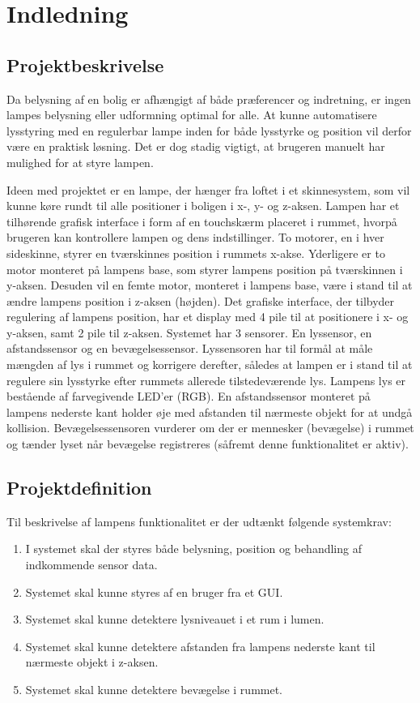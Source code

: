 \section{Indledning}

\subsection{Projektbeskrivelse}
Da belysning af en bolig er afhængigt af både præferencer og indretning, er ingen lampes belysning eller udformning optimal for alle. At kunne automatisere lysstyring med en regulerbar lampe inden for både lysstyrke og position vil derfor være en praktisk løsning. Det er dog stadig vigtigt, at brugeren manuelt har mulighed for at styre lampen.

Ideen med projektet er en lampe, der hænger fra loftet i et skinnesystem, som vil kunne køre rundt til alle positioner i boligen i x-, y- og z-aksen. Lampen har et tilhørende grafisk interface i form af en touchskærm placeret i rummet, hvorpå brugeren kan kontrollere lampen og dens indstillinger. To motorer, en i hver sideskinne, styrer en tværskinnes position i rummets x-akse. Yderligere er to motor monteret på lampens base, som styrer lampens position på tværskinnen i y-aksen. Desuden vil en femte motor, monteret i lampens base, være i stand til at ændre lampens position i z-aksen (højden). Det grafiske interface, der tilbyder regulering af lampens position, har et display med 4 pile til at positionere i x- og y-aksen, samt 2 pile til z-aksen.
Systemet har 3 sensorer. En lyssensor, en afstandssensor og en bevægelsessensor. Lyssensoren har til formål at måle mængden af lys i rummet og korrigere derefter, således at lampen er i stand til at regulere sin lysstyrke efter rummets allerede tilstedeværende lys. Lampens lys er bestående af farvegivende LED’er (RGB). En afstandssensor monteret på lampens nederste kant holder øje med afstanden til nærmeste objekt for at undgå kollision. Bevægelsessensoren vurderer om der er mennesker (bevægelse) i rummet og tænder lyset når bevægelse registreres (såfremt denne funktionalitet er aktiv).

\subsection{Projektdefinition}
Til beskrivelse af lampens funktionalitet er der udtænkt følgende systemkrav:
\begin{enumerate}
    \item I systemet skal der styres både belysning, position og behandling af indkommende sensor data. 
    \item Systemet skal kunne styres af en bruger fra et GUI.
    \item Systemet skal kunne detektere lysniveauet i et rum i lumen.
    \item Systemet skal kunne detektere afstanden fra lampens nederste kant til nærmeste objekt i z-aksen.
    \item Systemet skal kunne detektere bevægelse i rummet.
\end{enumerate}

